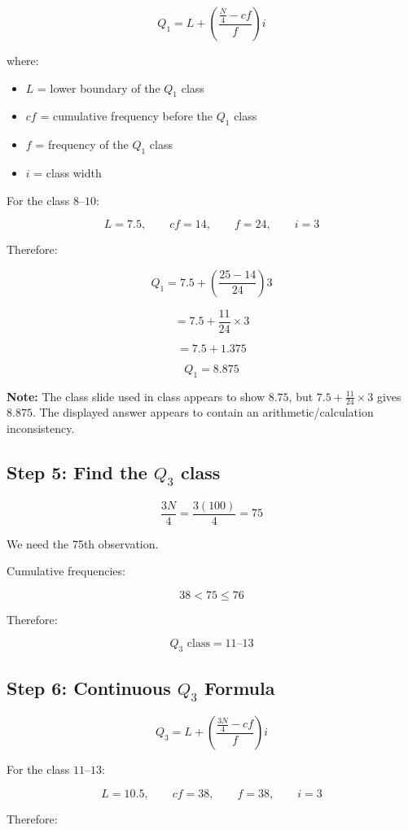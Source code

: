 \documentclass[12pt,a4paper]{article}
\newcommand{\boxformula}[1]{%
\[
\boxed{\displaystyle #1}
\]
}
\begin{document}
\boxformula{
Q_1
=
L+
\left(
\frac{\frac N4-cf}{f}
\right)i
}

where:
\begin{itemize}
    \item $L$ = lower boundary of the $Q_1$ class
    \item $cf$ = cumulative frequency before the $Q_1$ class
    \item $f$ = frequency of the $Q_1$ class
    \item $i$ = class width
\end{itemize}

For the class $8$--$10$:

\[
L=7.5,\qquad cf=14,\qquad f=24,\qquad i=3
\]

Therefore:

\[
Q_1
=
7.5+
\left(
\frac{25-14}{24}
\right)3
\]

\[
=
7.5+\frac{11}{24}\times3
\]

\[
=
7.5+1.375
\]

\[
\boxed{Q_1=8.875}
\]

\textbf{Note:} The class slide used in class appears to show $8.75$, but
$7.5+\frac{11}{24}\times3$ gives $8.875$. The displayed answer appears to
contain an arithmetic/calculation inconsistency.

\subsection*{Step 5: Find the $Q_3$ class}

\[
\frac{3N}{4}
=
\frac{3(100)}4
=
75
\]

We need the 75th observation.

Cumulative frequencies:

\[
38<75\leq76
\]

Therefore:

\[
\boxed{Q_3\text{ class}=11\text{--}13}
\]

\subsection*{Step 6: Continuous $Q_3$ Formula}

\boxformula{
Q_3
=
L+
\left(
\frac{\frac{3N}{4}-cf}{f}
\right)i
}

For the class $11$--$13$:

\[
L=10.5,\qquad cf=38,\qquad f=38,\qquad i=3
\]

Therefore:
\end{document}
